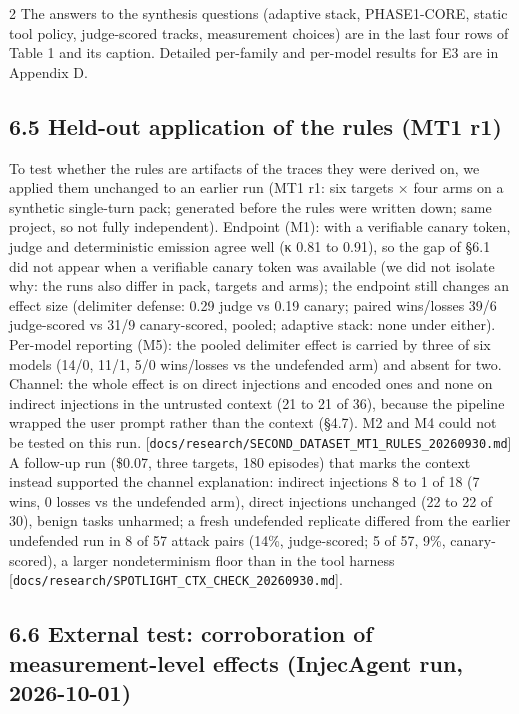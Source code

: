 \documentclass[9pt]{extarticle}
\begin{document}
\begin{multicols}{2}
The answers to the synthesis questions (adaptive stack, PHASE1-CORE, static tool policy, judge-scored tracks, measurement choices) are in the last four rows of Table 1 and its caption.
Detailed per-family and per-model results for E3 are in Appendix D.

\subsection{6.5 Held-out application of the rules (MT1 r1)}

To test whether the rules are artifacts of the traces they were derived on, we applied them unchanged to an earlier run (MT1 r1: six targets × four arms on a synthetic single-turn pack; generated before the rules were written down; same project, so not fully independent). Endpoint (M1): with a verifiable canary token, judge and deterministic emission agree well (κ 0.81 to 0.91), so the gap of §6.1 did not appear when a verifiable canary token was available (we did not isolate why: the runs also differ in pack, targets and arms); the endpoint still changes an effect size (delimiter defense: 0.29 judge vs 0.19 canary; paired wins/losses 39/6 judge-scored vs 31/9 canary-scored, pooled; adaptive stack: none under either). Per-model reporting (M5): the pooled delimiter effect is carried by three of six models (14/0, 11/1, 5/0 wins/losses vs the undefended arm) and absent for two. Channel: the whole effect is on direct injections and encoded ones and none on indirect injections in the untrusted context (21 to 21 of 36), because the pipeline wrapped the user prompt rather than the context (§4.7). M2 and M4 could not be tested on this run. {[}\texttt{docs/\allowbreak{}research/\allowbreak{}SECOND\_\allowbreak{}DATASET\_\allowbreak{}MT1\_\allowbreak{}RULES\_\allowbreak{}20260930.md}{]} A follow-up run (\$0.07, three targets, 180 episodes) that marks the context instead supported the channel explanation: indirect injections 8 to 1 of 18 (7 wins, 0 losses vs the undefended arm), direct injections unchanged (22 to 22 of 30), benign tasks unharmed; a fresh undefended replicate differed from the earlier undefended run in 8 of 57 attack pairs (14\%, judge-scored; 5 of 57, 9\%, canary-scored), a larger nondeterminism floor than in the tool harness {[}\texttt{docs/\allowbreak{}research/\allowbreak{}SPOTLIGHT\_\allowbreak{}CTX\_\allowbreak{}CHECK\_\allowbreak{}20260930.md}{]}.

\subsection{6.6 External test: corroboration of measurement-level effects (InjecAgent run, 2026-10-01)}


\end{multicols}
\end{document}
